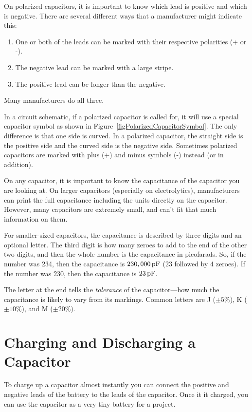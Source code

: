On polarized capacitors, it is important to know which lead is positive and which is negative.  
There are several different ways that a manufacturer might indicate this:
\begin{enumerate}
\item One or both of the leads can be marked with their respective polarities (+ or -).
\item The negative lead can be marked with a large stripe.  
\item The positive lead can be longer than the negative.
\end{enumerate}
Many manufacturers do all three.

In a circuit schematic, if a polarized capacitor is called for, it will use a special capacitor symbol as shown in Figure~\ref{figPolarizedCapacitorSymbol}. 
The only difference is that one side is curved.
In a polarized capacitor, the straight side is the positive side and the curved side is the negative side.
Sometimes polarized capacitors are marked with plus (+) and minus symbols (-) instead (or in addition).


On any capacitor, it is important to know the capacitance of the capacitor you are looking at.
On larger capacitors (especially on electrolytics), manufacturers can print the full capacitance including the units directly on the capacitor.
However, many capacitors are extremely small, and can't fit that much information on them.

For smaller-sized capacitors, the capacitance is described by three digits and an optional letter.
The third digit is how many zeroes to add to the end of the other two digits, and then the whole number is the capacitance in picofarads.
So, if the number was 234, then the capacitance is $230,000\mypf$ (23 followed by 4 zeroes).  
If the number was 230, then the capacitance is $23\mypf$.

The letter at the end tells the \emph{tolerance} of the capacitor---how much the capacitance is likely to vary from its markings.
Common letters are J ($\pm5\%$), K ($\pm10\%$), and M ($\pm20\%$).

\section{Charging and Discharging a Capacitor}

To charge up a capacitor almost instantly you can connect the positive and negative leads of the battery to the leads of the capacitor.
Once it it charged, you can use the capacitor as a very tiny battery for a project.


